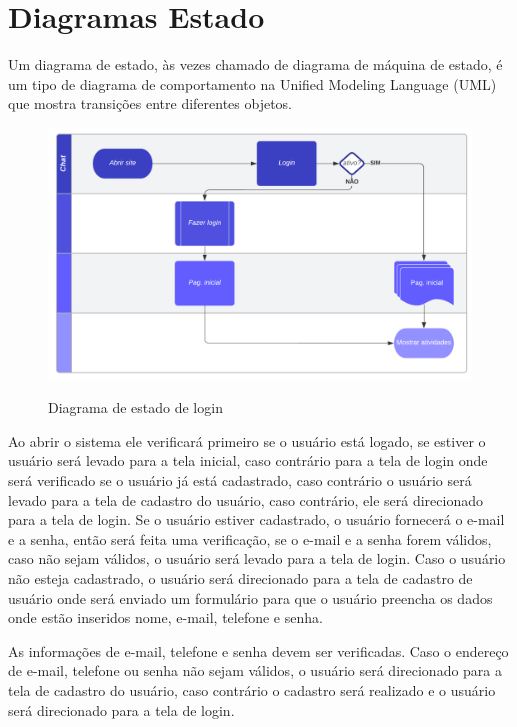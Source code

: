 \section{Diagramas Estado}
Um diagrama de estado, às vezes chamado de diagrama de máquina de estado, é um tipo de diagrama de comportamento na Unified Modeling Language (UML) que mostra transições entre diferentes objetos.
\begin{figure}[H]
      \begin{center}
            \caption{Diagrama de estado de login} \label{afp}
            \includegraphics[width=15cm]{Pictures/diagram/estado.png} \\


      \end{center}
\end{figure}
Ao abrir o sistema ele verificará primeiro se o usuário está logado, se estiver o usuário será levado para a tela inicial, caso contrário para a tela de login onde será verificado se o usuário já está cadastrado, caso contrário o usuário será levado para a tela de cadastro do usuário, caso contrário, ele será direcionado para a tela de login. Se o usuário estiver cadastrado, o usuário fornecerá o e-mail e a senha, então será feita uma verificação, se o e-mail e a senha forem válidos, caso não sejam válidos, o usuário será levado para a tela de login. Caso o usuário não esteja cadastrado, o usuário será direcionado para a tela de cadastro de usuário onde será enviado um formulário para que o usuário preencha os dados onde estão inseridos nome, e-mail, telefone e senha.

As informações de e-mail, telefone e senha devem ser verificadas. Caso o endereço de e-mail, telefone ou senha não sejam válidos, o usuário será direcionado para a tela de cadastro do usuário, caso contrário o cadastro será realizado e o usuário será direcionado para a tela de login.

